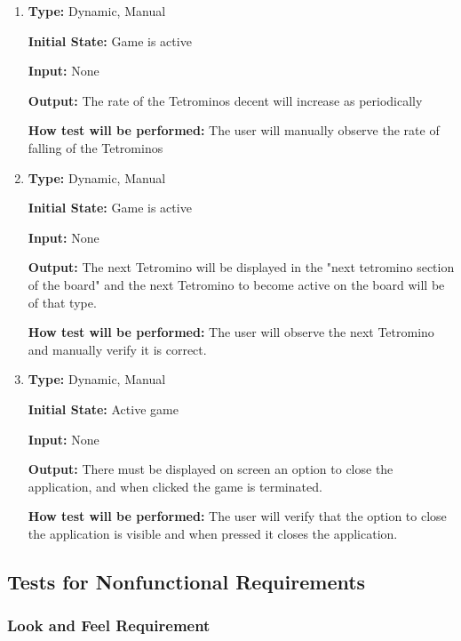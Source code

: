 \documentclass[12pt, titlepage]{article}
\begin{document}
\begin{enumerate}[{FR-BI-}1. ]
		\item
		\textbf{Type:} Dynamic, Manual
		
		\textbf{Initial State:} Game is active
		
		\textbf{Input:} None
		
		\textbf{Output:} The rate of the Tetrominos decent will increase as periodically
		
		\textbf{How test will be performed:} The user will manually observe the rate of falling of the Tetrominos
		
		\item
		\textbf{Type:} Dynamic, Manual
		
		\textbf{Initial State:} Game is active
		
		\textbf{Input:} None
		
		\textbf{Output:} The next Tetromino will be displayed in the "next tetromino section of the board"
		and the next Tetromino to become active on the board will be of that type.
		
		\textbf{How test will be performed:} The user will observe the next Tetromino and manually verify it is correct.
		
		\item
		\textbf{Type:} Dynamic, Manual
		
		\textbf{Initial State:} Active game
		
		\textbf{Input:} None
		
		\textbf{Output:} There must be displayed on screen an option to close the application, and when clicked the game is terminated.
		
		\textbf{How test will be performed:} The user will verify that the option to close the application is visible and when pressed it closes the application.
		
	\end{enumerate}
	
	\subsection{Tests for Nonfunctional Requirements}
	
	\subsubsection{Look and Feel Requirement}
	
\end{document}
